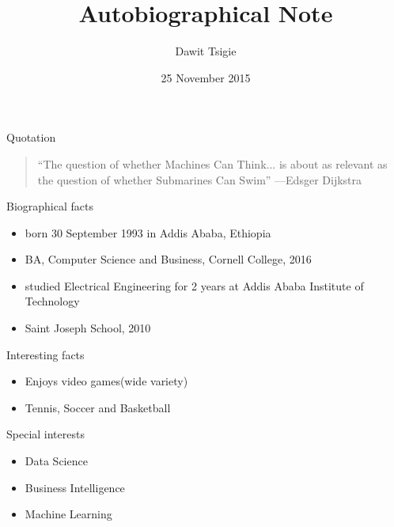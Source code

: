 \documentclass{beamer}
\title{Autobiographical Note}
\author{Dawit Tsigie}
\institute{Cornell College}
\date{25 November 2015}
\begin{document}
\begin{frame}
  \titlepage
\end{frame}

\begin{frame}{Quotation}
\begin{quotation}
\noindent
``The question of whether Machines Can Think... is about as relevant as the question of whether Submarines Can Swim''
  \flushright
  ---Edsger Dijkstra
  \end{quotation}
\end{frame}

\begin{frame}{Biographical facts}
\begin{itemize}
  \item born 30 September 1993 in Addis Ababa, Ethiopia
  \item BA, Computer Science and Business, Cornell College, 2016
  \item studied Electrical Engineering for 2 years at Addis Ababa Institute of Technology
  \item Saint Joseph School, 2010
  \end{itemize}
\end{frame}

\begin{frame}{Interesting facts}
\begin{itemize}
  	\item Enjoys video games(wide variety)
  	\item Tennis, Soccer and Basketball
  \end{itemize}
\end{frame}

\begin{frame}{Special interests}
\begin{itemize}
  \item Data Science
  \item Business Intelligence
  \item Machine Learning 
  
  
  \end{itemize}
\end{frame}
\end{document}
